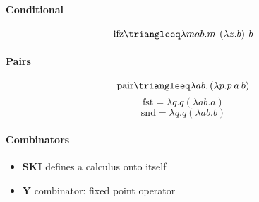 \documentclass[twocolumn,english]{article}
\begin{document}
\paragraph{Conditional}
\[
\text{ifz} \triangleeq \lambda mab.m\:\left(\lambda z.b\right)\:b
\]
\paragraph{Pairs}
\[
\text{pair} \triangleeq \lambda ab.\left(\lambda p.p\:a\:b\right)
\]
\[
\text{fst} = \lambda q.q\left(\lambda ab.a\right)
\]
\[
\text{snd} = \lambda q.q\left(\lambda ab.b\right)
\]
\paragraph{Combinators}

\begin{itemize}
\item \textbf{SKI} defines a calculus onto itself
\item \textbf{Y} combinator: fixed point operator
\end{itemize}
\end{document}
